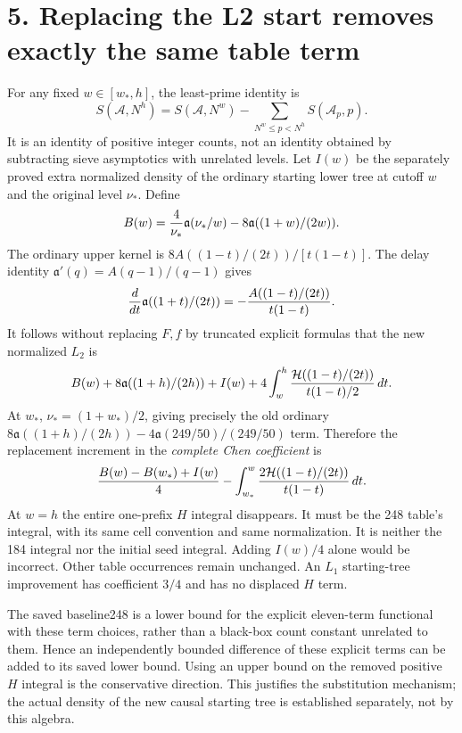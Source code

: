 \documentclass[11pt]{article}
\newcommand{\HH}{\mathcal H}
\newcommand{\aa}{\mathfrak a}
\begin{document}
\section*{5. Replacing the L2 start removes exactly the same table term}
For any fixed $w\in[w_*,h]$, the least-prime identity is
\[
 S(\mathcal A,N^h)=S(\mathcal A,N^w)
                  -\sum_{N^w\le p<N^h}S(\mathcal A_p,p).
\]
It is an identity of positive integer counts, not an identity obtained
by subtracting sieve asymptotics with unrelated levels. Let $I(w)$ be
the separately proved extra normalized density of the ordinary
starting lower tree at cutoff $w$ and the original level $\nu_*$.
Define
\[
 B(w)={4\over\nu_*}\aa(\nu_*/w)
          -8\aa((1+w)/(2w)).
\]
The ordinary upper kernel is $8A((1-t)/(2t))/[t(1-t)]$.
The delay identity $\aa'(q)=A(q-1)/(q-1)$ gives
\[
 {d\over dt}\aa((1+t)/(2t))
       =-{A((1-t)/(2t))\over t(1-t)}.
\]
It follows without replacing $F,f$ by truncated explicit formulas that
the new normalized $L_2$ is
\[
 B(w)+8\aa((1+h)/(2h))+I(w)
        +4\int_w^h {\HH((1-t)/(2t))\over t(1-t)/2}\,dt.
\]
At $w_*$, $\nu_*=(1+w_*)/2$, giving precisely the old ordinary
$8\aa((1+h)/(2h))-4\aa(249/50)/(249/50)$ term. Therefore the
replacement increment in the \emph{complete Chen coefficient} is
\begin{equation}\label{eq:move}
 {B(w)-B(w_*)+I(w)\over4}
       -\int_{w_*}^w {2\HH((1-t)/(2t))\over t(1-t)}\,dt.
\end{equation}
At $w=h$ the entire one-prefix $H$ integral disappears. It must be
the 248 table's integral, with its same cell convention and same
normalization. It is neither the 184 integral nor the initial seed
integral. Adding $I(w)/4$ alone would be incorrect. Other table
occurrences remain unchanged. An $L_1$ starting-tree improvement has
coefficient $3/4$ and has no displaced $H$ term.

The saved baseline248 is a lower bound for the explicit eleven-term
functional with these term choices, rather than a black-box count
constant unrelated to them. Hence an independently bounded difference
of these explicit terms can be added to its saved lower bound.
Using an upper bound on the removed positive $H$ integral is the
conservative direction. This justifies the substitution mechanism;
the actual density of the new causal starting tree is established
separately, not by this algebra.
\end{document}
